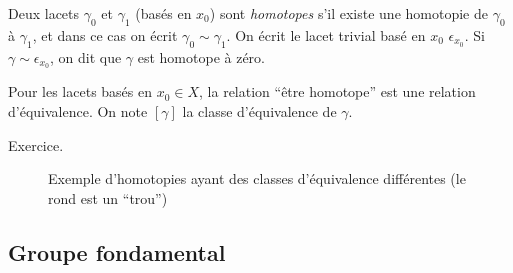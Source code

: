     \begin{defi}
      Deux lacets $\gamma_0$ et $\gamma_1$ (basés en $x_0$) sont \emph{homotopes} s'il existe une homotopie de
      $\gamma_0$ à $\gamma_1$, et dans ce cas on écrit $\gamma_0 \sim \gamma_1$. On écrit le lacet trivial
      basé en $x_0$ $\epsilon_{x_0}$. Si $\gamma \sim \epsilon_{x_0}$, on dit que $\gamma$ est homotope à zéro.
    \end{defi}

    \begin{prop}
      Pour les lacets basés en $x_0 \in X$, la relation ``être homotope'' est une relation d'équivalence. On
      note $[\gamma]$ la classe d'équivalence de $\gamma$.
    \end{prop}

    \begin{preuve}
      Exercice.
    \end{preuve}

    \begin{figure}[h]
      \centering
      \caption{Exemple d'homotopies ayant des classes d'équivalence différentes (le rond est un ``trou'')}
      \label{fig:exemple-homotopie-classes-equiv}
    \end{figure}

    
    \subsection{Groupe fondamental}

